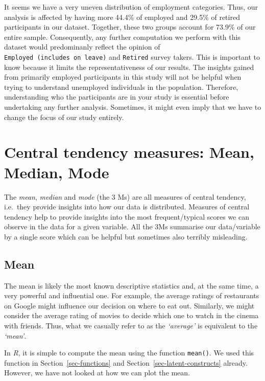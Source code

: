 \documentclass[
  letterpaper,
]{krantz}
\begin{document}
It seems we have a very uneven distribution of employment categories.
Thus, our analysis is affected by having more 44.4\% of employed and
29.5\% of retired participants in our dataset. Together, these two
groups account for 73.9\% of our entire sample. Consequently, any
further computation we perform with this dataset would predominanly
reflect the opinion of \texttt{Employed\ (includes\ on\ leave)} and
\texttt{Retired} survey takers. This is important to know because it
limits the representativeness of our results. The insights gained from
primarily employed participants in this study will not be helpful when
trying to understand unemployed individuals in the population.
Therefore, understanding who the participants are in your study is
essential before undertaking any further analysis. Sometimes, it might
even imply that we have to change the focus of our study entirely.

\section{Central tendency measures: Mean, Median,
Mode}\label{sec-central-tendency}

The \emph{mean}, \emph{median} and \emph{mode} (the 3 Ms) are all
measures of central tendency, i.e.~they provide insights into how our
data is distributed. Measures of central tendency help to provide
insights into the most frequent/typical scores we can observe in the
data for a given variable. All the 3Ms summarise our data/variable by a
single score which can be helpful but sometimes also terribly
misleading.

\subsection{Mean}\label{sec-mean}

The mean is likely the most known descriptive statistics and, at the
same time, a very powerful and influential one. For example, the average
ratings of restaurants on Google might influence our decision on where
to eat out. Similarly, we might consider the average rating of movies to
decide which one to watch in the cinema with friends. Thus, what we
casually refer to as the \emph{`average'} is equivalent to the
\emph{`mean'}.

In \emph{R}, it is simple to compute the mean using the function
\texttt{mean()}. We used this function in Section~\ref{sec-functions}
and Section~\ref{sec-latent-constructs} already. However, we have not
looked at how we can plot the mean.
\end{document}
